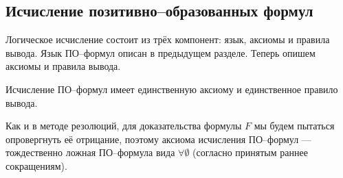 






\subsection{Исчисление позитивно--образованных формул}
Логическое исчисление состоит из трёх компонент: язык, аксиомы и правила вывода. Язык ПО--формул описан в предыдущем разделе. Теперь опишем аксиомы и правила вывода.

Исчисление ПО--формул имеет единственную аксиому и единственное правило вывода.

Как и в методе резолюций, для доказательства формулы $F$ мы будем пытаться опровергнуть её отрицание, поэтому аксиома исчисления ПО--формул --- тождественно ложная ПО--формула вида $\forall \emptyset$ (согласно принятым раннее сокращениям). %

